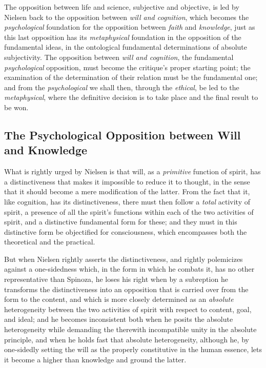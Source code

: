 \documentclass[12pt,a4paper]{book}
\begin{document}
The opposition between life and science, subjective and objective, is
led by Nielsen back to the opposition between \emph{will and cognition}, which
becomes the \emph{psychological} foundation for the opposition between \emph{faith}
and \emph{knowledge}, just as this last opposition has its \emph{metaphysical}
foundation in the opposition of the fundamental ideas, in the
ontological fundamental determinations of absolute subjectivity. The
opposition between \emph{will and cognition}, the fundamental \emph{psychological}
opposition, must become the critique's proper starting point; the
examination of the determination of their relation must be the
fundamental one; and from the \emph{psychological} we shall then, through the
\emph{ethical}, be led to the \emph{metaphysical}, where the definitive decision is
to take place and the final result to be won.

\subsection{The Psychological Opposition between Will and Knowledge}
\label{ssec:psych-opposition}

What is rightly urged by Nielsen is that will, as a \emph{primitive} function
of spirit, has a distinctiveness that makes it impossible to reduce it
to thought, in the sense that it should become a mere modification of
the latter. From the fact that it, like cognition, has its
distinctiveness, there must then follow a \emph{total} activity of spirit, a
presence of all the spirit's functions within each of the two
activities of spirit, and a distinctive fundamental form for these;
and they must in this distinctive form be objectified for
consciousness, which encompasses both the theoretical and the
practical.

But when Nielsen rightly asserts the distinctiveness, and rightly polemicizes against a
one-sidedness which, in the form in which he combats it, has no other representative than
Spinoza, he loses his right when by a subreption he transforms the distinctiveness into an
opposition that is carried over from the form to the content, and which is more
closely determined as an \emph{absolute} heterogeneity between the two activities of spirit
with respect to content, goal, and ideal; and he becomes inconsistent both when he posits
the absolute heterogeneity while demanding the therewith incompatible unity in the absolute
principle, and when he holds fast that absolute heterogeneity, although he, by one-sidedly
setting the will as the properly constitutive in the human essence, lets it become a higher
than knowledge and ground the latter.
\end{document}
